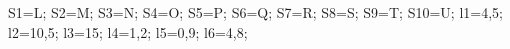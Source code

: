 \documentclass[exercice]{thedocument}%
\begin{document}
%
    \>S1=L;%
    \>S2=M;%
    \>S3=N;%
    \>S4=O;%
    \>S5=P;%
    \>S6=Q;%
    \>S7=R;%
    \>S8=S;%
    \>S9=T;%
    \>S10=U;%
    \>l1=4,5;%
    \>l2=10,5;%
    \>l3=15;%
    \>l4=1,2;%
    \>l5=0,9;%
    \>l6=4,8;%
\end{document}
